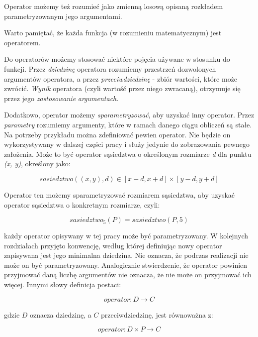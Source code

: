 \documentclass[./FM_mgr.tex]{subfiles}
\begin{document}
Operator możemy też rozumieć jako zmienną losową opisaną rozkładem parametryzowanym jego argumentami.

Warto pamiętać, że każda funkcja (w rozumieniu matematycznym) jest operatorem.

Do operatorów możemy stosować niektóre pojęcia używane w stosunku do funkcji. 
Przez \emph{dziedzinę} operatora rozumiemy przestrzeń dozwolonych argumentów operatora, a przez \emph{przeciwdziedzinę} - zbiór wartości, które może zwrócić.
\emph{Wynik} operatora (czyli wartość przez niego zwracaną), otrzymuje się przez jego \emph{zastosowanie} \emph{argumentach}.

Dodatkowo, operator możemy \emph{sparametryzować}, aby uzyskać inny operator. 
Przez \emph{parametry} rozumiemy argumenty, które w ramach danego ciągu obliczeń są stałe. 
Na potrzeby przykładu można zdefiniować pewien operator.
Nie będzie on wykorzystywany w dalszej części pracy i służy jedynie do zobrazowania pewnego założenia.
Może to być operator sąsiedztwa o określonym rozmiarze \emph{d} dla punktu \emph{(x, y)}, określony jako:

\begin{displaymath}
	sasiedztwo((x, y), d) \in [x-d, x+d] \times [y-d, y+d]
\end{displaymath}

Operator ten możemy sparametryzować rozmiarem sąsiedztwa, aby uzyskać operator sąsiedztwa o konkretnym rozmiarze, czyli:

\begin{displaymath}
	sasiedztwo_5 (P) = sasiedztwo (P, 5)
\end{displaymath}

\Defacto każdy operator opisywany w tej pracy może być parametryzowany. 
W kolejnych rozdziałach przyjęto konwencję, według której definiując nowy operator zapisywana jest jego minimalna dziedzina. 
Nie oznacza, że podczas realizacji nie może on być parametryzowany. 
Analogicznie stwierdzenie, że operator powinien przyjmować daną liczbę argumentów nie oznacza, że nie może on przyjmować ich więcej. 
Innymi słowy definicja postaci:

\begin{displaymath}
	operator: D \rightarrow C
\end{displaymath}

gdzie $D$ oznacza dziedzinę, a $C$ przeciwdziedzinę, jest równoważna z:

\begin{displaymath}
	operator: D \times P \rightarrow C
\end{displaymath}
\end{document}
